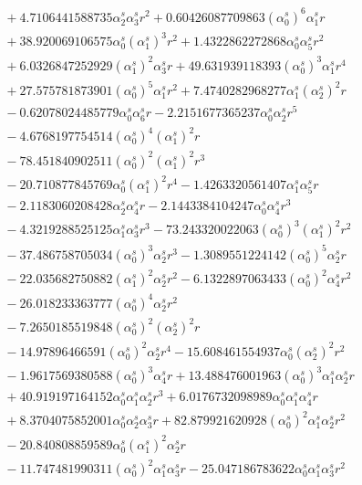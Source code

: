 \documentclass[10pt]{article}
\begin{document}
\begin{align*}
&{}  + 4.7106441588735 \alpha_{2}^s \alpha_{3}^s r^{2} + 0.60426087709863 \left(\alpha_{0}^s\right)^{6} \alpha_{1}^s r \\
&{}  + 38.920069106575 \alpha_{0}^s \left(\alpha_{1}^s\right)^{3} r^{2} + 1.4322862272868 \alpha_{0}^s \alpha_{5}^s r^{2} \\
&{}  + 6.0326847252929 \left(\alpha_{1}^s\right)^{2} \alpha_{3}^s r + 49.631939118393 \left(\alpha_{0}^s\right)^{3} \alpha_{1}^s r^{4} \\
&{}  + 27.575781873901 \left(\alpha_{0}^s\right)^{5} \alpha_{1}^s r^{2} + 7.4740282968277 \alpha_{1}^s \left(\alpha_{2}^s\right)^{2} r \\
&{}  - 0.62078024485779 \alpha_{0}^s \alpha_{6}^s r - 2.2151677365237 \alpha_{0}^s \alpha_{2}^s r^{5} \\
&{}  - 4.6768197754514 \left(\alpha_{0}^s\right)^{4} \left(\alpha_{1}^s\right)^{2} r \\
&{}  - 78.451840902511 \left(\alpha_{0}^s\right)^{2} \left(\alpha_{1}^s\right)^{2} r^{3} \\
&{}  - 20.710877845769 \alpha_{0}^s \left(\alpha_{1}^s\right)^{2} r^{4} - 1.4263320561407 \alpha_{1}^s \alpha_{5}^s r \\
&{}  - 2.1183060208428 \alpha_{2}^s \alpha_{4}^s r - 2.1443384104247 \alpha_{0}^s \alpha_{4}^s r^{3} \\
&{}  - 4.3219288525125 \alpha_{1}^s \alpha_{3}^s r^{3} - 73.243320022063 \left(\alpha_{0}^s\right)^{3} \left(\alpha_{1}^s\right)^{2} r^{2} \\
&{}  - 37.486758705034 \left(\alpha_{0}^s\right)^{3} \alpha_{2}^s r^{3} - 1.3089551224142 \left(\alpha_{0}^s\right)^{5} \alpha_{2}^s r \\
&{}  - 22.035682750882 \left(\alpha_{1}^s\right)^{2} \alpha_{2}^s r^{2} - 6.1322897063433 \left(\alpha_{0}^s\right)^{2} \alpha_{4}^s r^{2} \\
&{}  - 26.018233363777 \left(\alpha_{0}^s\right)^{4} \alpha_{2}^s r^{2} \\
&{}  - 7.2650185519848 \left(\alpha_{0}^s\right)^{2} \left(\alpha_{2}^s\right)^{2} r \\
&{}  - 14.97896466591 \left(\alpha_{0}^s\right)^{2} \alpha_{2}^s r^{4} - 15.608461554937 \alpha_{0}^s \left(\alpha_{2}^s\right)^{2} r^{2} \\
&{}  - 1.9617569380588 \left(\alpha_{0}^s\right)^{3} \alpha_{4}^s r + 13.488476001963 \left(\alpha_{0}^s\right)^{3} \alpha_{1}^s \alpha_{2}^s r \\
&{}  + 40.919197164152 \alpha_{0}^s \alpha_{1}^s \alpha_{2}^s r^{3} + 6.0176732098989 \alpha_{0}^s \alpha_{1}^s \alpha_{4}^s r \\
&{}  + 8.3704075852001 \alpha_{0}^s \alpha_{2}^s \alpha_{3}^s r + 82.879921620928 \left(\alpha_{0}^s\right)^{2} \alpha_{1}^s \alpha_{2}^s r^{2} \\
&{}  - 20.840808859589 \alpha_{0}^s \left(\alpha_{1}^s\right)^{2} \alpha_{2}^s r \\
&{}  - 11.747481990311 \left(\alpha_{0}^s\right)^{2} \alpha_{1}^s \alpha_{3}^s r - 25.047186783622 \alpha_{0}^s \alpha_{1}^s \alpha_{3}^s r^{2}
\end{align*}
\end{document}
